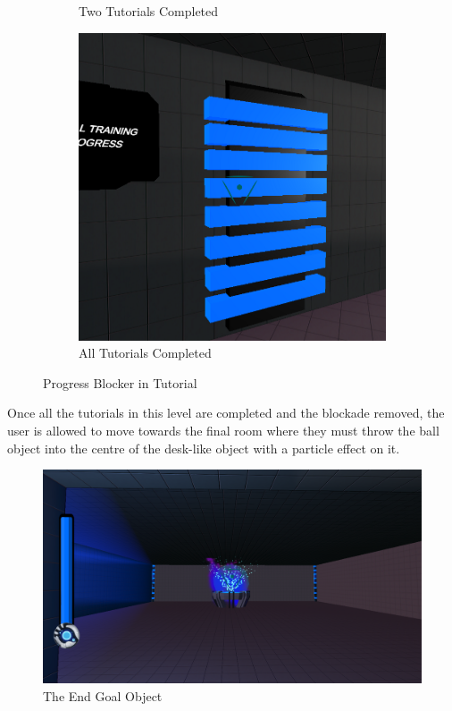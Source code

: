 \begin{figure}[H]
\begin{subfigure}{0.3\textwidth}
  \caption{Two Tutorials Completed}
\end{subfigure}
\begin{subfigure}{0.3\textwidth}
  \centering
  \includegraphics[width=1\linewidth]{Figures/barrier0.png}
  \caption{All Tutorials Completed}
\end{subfigure}
\caption{Progress Blocker in Tutorial}
\end{figure}

\noindent Once all the tutorials in this level are completed and the blockade removed, the user is allowed to move towards the final room where they must throw the ball object into the centre of the desk-like object with a particle effect on it.

\begin{figure}[H]
\centering
\centerline{\includegraphics[scale=0.33]{Figures/endgoal.png}}
\caption{The End Goal Object}
\end{figure}

